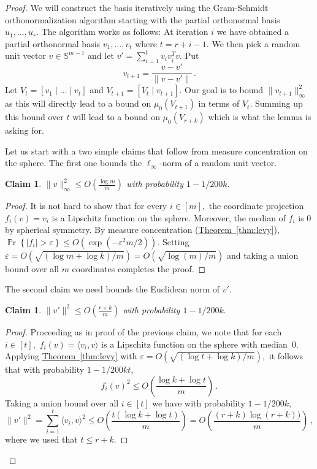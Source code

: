 \documentclass[letterpaper,11pt]{article}
\newtheorem{claim}[theorem]{Claim}
\theoremstyle{definition}
\newcommand{\claimlabel}[1]{\label{claim:#1}}
\newcommand{\theoremref}[1]{\hyperref[thm:#1]{Theorem~\ref{thm:#1}}}
\newcommand{\Psymb}{\mathbb{P}}
\DeclareMathOperator*{\ProbOp}{\Psymb r}
\renewcommand{\Pr}{\ProbOp}
\newcommand{\mper}{\,.}
\newcommand{\mcom}{\,,}
\renewcommand{\le}{\leqslant}
\newcommand{\Set}[1]{\left\{#1\right\}}
\renewcommand{\epsilon}{\varepsilon}
\begin{document}
\begin{proof}
We will construct the basis iteratively using the Gram-Schmidt orthonormalization
algorithm starting with the partial orthonormal basis $u_1,\dots,u_r.$ The
algorithm works as follows: At
iteration $i$ we have obtained a partial orthonormal basis $v_1,\dots,v_t$
where $t=r+i-1.$ We then pick a random unit vector $v\in\mathbb{S}^{m-1}$ and
let $v' = \sum_{i=1}^t v_iv_i^Tv.$ Put
\[
v_{t+1} = \frac{v-v'}{\|v-v'\|}\mper
\]
Let $V_t=[v_1\mid\dots\mid v_t]$ and $V_{t+1}=[V_t\mid v_{t+1}].$
Our goal is to bound $\|v_{t+1}\|_\infty^2$ as this will directly lead to a bound
on $\mu_0(V_{t+1})$ in terms of $V_t.$ Summing up this bound over $t$ will
lead to a bound on $\mu_0(V_{r+k})$ which is what the lemma is asking for.

Let us start with a two simple claims that follow from measure concentration
on the sphere. The first one bounds the $\ell_\infty$-norm of a random unit
vector.
\begin{claim}\claimlabel{one}
$\|v\|_\infty^2 \le O\left(\frac{\log m}m\right)$ with probability
$1-1/200k.$
\end{claim}
\begin{proof}
It is not hard to show that for every $i\in[m],$ the coordinate projection
$f_i(v)=v_i$ is a Lipschitz function on the sphere. Moreover, the median of
$f_i$ is $0$ by spherical symmetry. By measure
concentration (\theoremref{levy}), $\Pr\Set{\left|f_i\right|>
\epsilon}\le O(\exp(-\epsilon^2m/2)).$ Setting $\epsilon=O( \sqrt{(\log
m+\log k)/m})=O(\sqrt{\log(m)/m})$
and taking a union bound over all $m$ coordinates completes the proof.
\end{proof}

The second claim we need bounds the Euclidean norm of $v'.$

\begin{claim}\claimlabel{two}
$\|v'\|^2\le O\left(\frac {r+k} m\right)$ with probability $1-1/200k.$
\end{claim}
\begin{proof}
Proceeding as in proof of the previous claim, we note that for each $i\in[t],$
$f_i(v)=\langle v_i,v\rangle$ is a Lipschitz function on the sphere with
median~$0.$ Applying \theoremref{levy} with $\epsilon=O(\sqrt{(\log t+\log
k)/m}),$ it follows that with probability $1-1/200kt,$
\[
f_i(v)^2\le O\left(\frac{\log k+\log t}m\right)\mper
\]
Taking a union bound over all
$i\in[t]$ we have with probability $1-1/200k,$
\[
\|v'\|^2=\sum_{i=1}^t\langle v_i,v\rangle^2
\le O\left(\frac{t(\log k+\log t)}m\right)
= O\left(\frac{(r+k)\log(r+k))}m\right)
\mcom
\]
where we used that $t\le r+k.$
\end{proof}


\end{proof}
\end{document}
